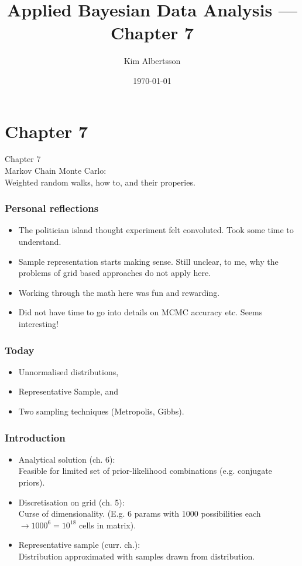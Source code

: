 \documentclass[usenames,dvipsnames,table]{beamer}
\title[ABDA Ch. 7]{Applied Bayesian Data Analysis --- Chapter 7}
\author{Kim Albertsson} %
\institute[LTU and CERN]
{
CERN and Luleå University of Technology \\
\medskip
\textit{kim.albertsson@ltu.se}
}
\date{\today}
\begin{document}
\begin{frame}
\titlepage %
\end{frame}

\section{Chapter 7}
\begin{frame}
\begin{center}
{\huge{Chapter 7}}
\\\vspace{2em}
Markov Chain Monte Carlo:\\
Weighted random walks, how to, and their properies.
\end{center}
\end{frame}

\begin{frame}
\frametitle{Personal reflections}
\begin{itemize}
\item The politician island thought experiment felt convoluted. Took some time to understand.
\item Sample representation starts making sense. Still unclear, to me, why the problems of grid based approaches do not apply here.
\item Working through the math here was fun and rewarding.
\item Did not have time to go into details on MCMC accuracy etc. Seems interesting!
\end{itemize}
\end{frame}

\begin{frame}
\frametitle{Today}
\begin{itemize}
\item Unnormalised distributions,
\item Representative Sample, and
\item Two sampling techniques (Metropolis, Gibbs).
\end{itemize}
\end{frame}

\begin{frame}
\frametitle{Introduction}
\begin{itemize}
\item Analytical solution (ch. 6):\\
      Feasible for limited set of prior-likelihood combinations (e.g. conjugate priors).
\item Discretisation on grid (ch. 5):\\
      Curse of dimensionality. (E.g. 6 params with 1000 possibilities each $\to 1000^6 = 10^{18}$ cells in matrix).
\item Representative sample (curr. ch.):\\
      Distribution approximated with samples drawn from distribution.
\end{itemize}
\end{frame}
\end{document}

